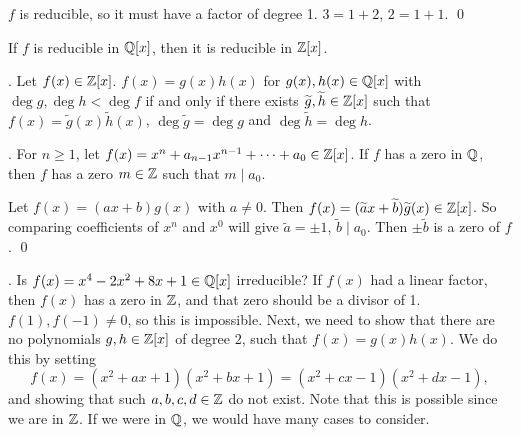 \pf \(f\) is reducible, so it must have a factor of degree 1. \(3 = 1 + 2\), \(2 = 1 + 1\). \qed

If \(f\) is reducible in \(\mathbb{Q}[x]\), then it is reducible in \(\mathbb{Z}[x]\).

\thm. Let \(f(x) \in \mathbb{Z}[x]\). \(f(x) = g(x) h(x)\) for \(g(x), h(x) \in \mathbb{Q}[x]\) with \(\deg g, \deg h < \deg f\) if and only if there exists \(\widetilde{g}, \widetilde{h} \in \mathbb{Z}[x]\) such that \(f(x) = \widetilde{g}(x) \widetilde{h}(x)\), \(\deg \widetilde{g} = \deg g\) and \(\deg \widetilde{h} = \deg h\).

\cor. For \(n \geq 1\), let \(f(x) = x^n + a_{n-1}x^{n-1} + \cdots + a_0 \in \mathbb{Z}[x]\). If \(f\) has a zero in \(\mathbb{Q}\), then \(f\) has a zero \(m \in \mathbb{Z}\) such that \(m \mid a_0\).

\pf Let \(f(x) = (ax + b) g(x)\) with \(a \neq 0\). Then \(f(x) = (\widetilde{a}x + \widetilde{b})\widetilde{g}(x) \in \mathbb{Z}[x]\). So comparing coefficients of \(x^n\) and \(x^0\) will give \(\widetilde{a} = \pm 1\), \(\widetilde{b} \mid a_0\). Then \(\pm\widetilde{b}\) is a zero of \(f\). \qed

\ex. Is \(f(x) = x^4 - 2x^2 + 8x + 1 \in \mathbb{Q}[x]\) irreducible? If \(f(x)\) had a linear factor, then \(f(x)\) has a zero in \(\mathbb{Z}\), and that zero should be a divisor of 1. \(f(1), f(-1) \neq 0\), so this is impossible. Next, we need to show that there are no polynomials \(g, h \in \mathbb{Z}[x]\) of degree \(2\), such that \(f(x) = g(x) h(x)\). We do this by setting
\[
    f(x) = (x^2 + ax + 1)(x^2 + bx + 1) = (x^2 + cx - 1)(x^2 + dx - 1),
\]
and showing that such \(a, b, c, d \in \mathbb{Z}\) do not exist. Note that this is possible since we are in \(\mathbb{Z}\). If we were in \(\mathbb{Q}\), we would have many cases to consider.

\pagebreak
